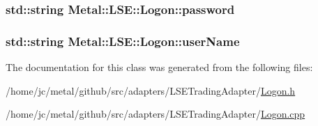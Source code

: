 \subsubsection[{password}]{\setlength{\rightskip}{0pt plus 5cm}std\+::string Metal\+::\+L\+S\+E\+::\+Logon\+::password}\label{classMetal_1_1LSE_1_1Logon_ae8181000986aeb93bf3e3b989fc238ae}
\hypertarget{classMetal_1_1LSE_1_1Logon_a10fa4ed887ed159b7157e5aab908b18f}{}
\subsubsection[{user\+Name}]{\setlength{\rightskip}{0pt plus 5cm}std\+::string Metal\+::\+L\+S\+E\+::\+Logon\+::user\+Name}\label{classMetal_1_1LSE_1_1Logon_a10fa4ed887ed159b7157e5aab908b18f}


The documentation for this class was generated from the following files\+:\begin{DoxyCompactItemize}
\item 
/home/jc/metal/github/src/adapters/\+L\+S\+E\+Trading\+Adapter/\hyperlink{Logon_8h}{Logon.\+h}\item 
/home/jc/metal/github/src/adapters/\+L\+S\+E\+Trading\+Adapter/\hyperlink{Logon_8cpp}{Logon.\+cpp}\end{DoxyCompactItemize}
